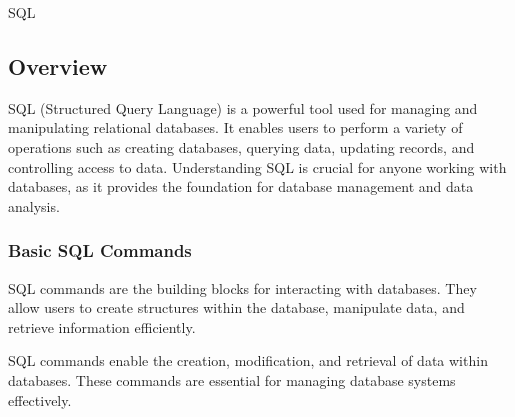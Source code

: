 \begin{notes}{SQL}
    \subsection*{Overview}

    SQL (Structured Query Language) is a powerful tool used for managing and manipulating relational databases. It enables users to perform a variety of operations such as creating databases, querying data, updating records, and controlling access to data. Understanding SQL is crucial for anyone working with databases, as it provides the foundation for database management and data analysis.
    
    \subsubsection*{Basic SQL Commands}
    
    SQL commands are the building blocks for interacting with databases. They allow users to create structures within the database, manipulate data, and retrieve information efficiently.
    
    \begin{highlight}
    
        SQL commands enable the creation, modification, and retrieval of data within databases. These commands are essential for managing database systems effectively.
        

\end{highlight}
\end{notes}
